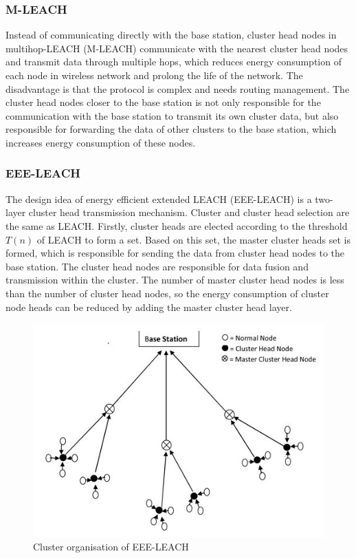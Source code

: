 \documentclass[11pt]{report}
\begin{document}
	\subsubsection{M-LEACH}
	Instead of communicating directly with the base station, cluster head nodes in multihop-LEACH (M-LEACH)\cite{7342720} communicate with the nearest cluster head nodes  and transmit data through multiple hops, which reduces energy consumption of each node in wireless network and prolong the life of the network.  The disadvantage is that the protocol is complex and needs routing management. The cluster head nodes closer to the base station is not only responsible for the communication with the base station to transmit its own cluster data, but also responsible for forwarding the data of other clusters to the base station, which increases energy consumption of these nodes.
	
	
	
	\subsubsection{EEE-LEACH}
	The design idea of energy efficient extended LEACH (EEE-LEACH) \cite{6200608} is a two-layer cluster head transmission mechanism. Cluster and cluster head selection are the same as LEACH. Firstly, cluster heads are elected according to the threshold $T(n)$ of LEACH to form a set. Based on this set, the master cluster heads set is formed, which is responsible for sending the data from cluster head nodes to the base station. The cluster head nodes are responsible for data fusion and transmission within the cluster. The number of master cluster head nodes is less than the number of cluster head nodes, so the energy consumption of cluster node heads can be reduced by adding the master cluster head layer. 
	\begin{figure}[h!]
		\centering
		\includegraphics[width=0.5\linewidth]{eeeleach.jpg}
		\caption{Cluster organisation of EEE-LEACH}
		\label{}
	\end{figure}
\end{document}
